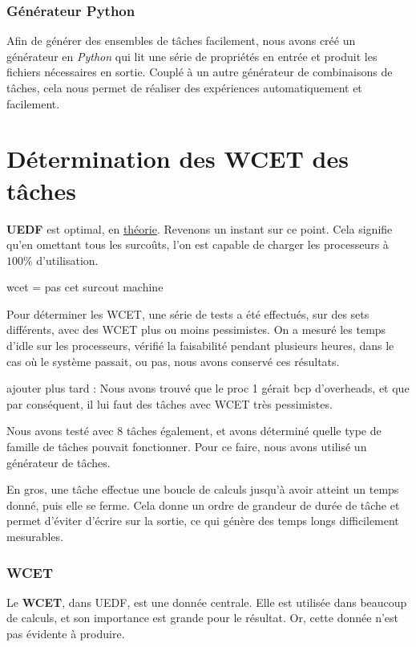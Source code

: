 	\subsubsection{Générateur Python}
	Afin de générer des ensembles de tâches facilement, nous avons créé un générateur en \textit{Python} qui 
	lit une série de propriétés en entrée et produit les fichiers nécessaires en sortie. 
	Couplé à un autre générateur de combinaisons de tâches, cela nous permet de réaliser des expériences 
	automatiquement et facilement.
	

\section{Détermination des WCET des tâches}
	\textbf{UEDF} est optimal, en \underline{théorie}. Revenons un instant sur ce point. 
	Cela signifie qu'en omettant tous les surcoûts, l'on est capable de charger les processeurs 
	à $100\%$ d'utilisation. 
	
	wcet = pas cet
	surcout
	machine

Pour déterminer les WCET, une série de tests a été effectués, sur des sets différents, 
avec des WCET plus ou moins pessimistes. 
On a mesuré les temps d'idle sur les processeurs, 
vérifié la faisabilité pendant plusieurs heures, 
dans le cas où le système passait, ou pas, nous avons conservé ces résultats.

ajouter plus tard :
Nous avons trouvé que le proc 1 gérait bcp d'overheads, et que par conséquent, il
lui faut des tâches avec WCET très pessimistes.

Nous avons testé avec 8 tâches également, et avons déterminé quelle 
type de famille de tâches pouvait fonctionner. Pour ce faire, nous avons utilisé un 
générateur de tâches.

En gros, une tâche effectue une boucle de calculs jusqu'à avoir atteint un temps donné, puis elle se ferme. 
Cela donne un ordre de grandeur de durée de tâche et permet d'éviter d'écrire sur la sortie, ce qui 
génère des temps longs difficilement mesurables.

		
\subsubsection{WCET}
Le \textbf{WCET}, dans UEDF, est une donnée centrale. Elle est utilisée dans beaucoup de calculs, et 
son importance est grande pour le résultat. Or, cette donnée n'est pas évidente à produire. \newline

